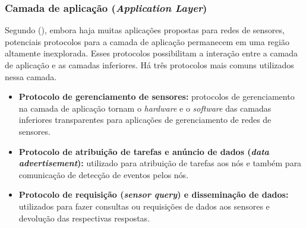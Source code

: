  \subsubsection{Camada de aplicação (\emph{Application Layer})}
 
 Segundo  (\citeyear{Akyildiz2002}), embora haja muitas aplicações propostas para redes de sensores, potenciais protocolos para a camada de aplicação permanecem em uma região altamente inexplorada. Esses protocolos possibilitam a interação entre a camada de aplicação e as camadas inferiores. Há três protocolos mais comuns utilizados nessa camada. 
 
 \begin{itemize}
 \item \textbf{Protocolo de gerenciamento de sensores:} protocolos de gerenciamento na camada de aplicação tornam o \textit{hardware} e o \textit{software} das camadas inferiores transparentes para aplicações de gerenciamento de redes de sensores.
 \item \textbf{Protocolo de atribuição de tarefas e anúncio de dados (\textit{data advertisement}):} utilizado para atribuição de tarefas aos nós e também para comunicação de detecção de eventos pelos nós.
 \item \textbf{Protocolo de requisição (\textit{sensor query}) e disseminação de dados:} utilizados para fazer consultas ou requisições de dados aos sensores e devolução das respectivas respostas.
 \end{itemize}